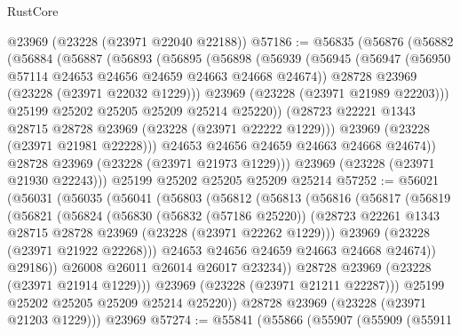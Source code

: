 \begin{lexlean}{RustCore}
\begin{coremodule}
    @23969
    (@23228 (@23971 @22040 @22188))
@57186 := @56835
    (@56876
      (@56882
        (@56884
          (@56887
            (@56893
              (@56895
                (@56898
                  (@56939
                    (@56945
                      (@56947 (@56950 @57114 @24653 @24656 @24659 @24663 @24668 @24674))
                      @28728
                      @23969
                      (@23228 (@23971 @22032 @1229)))
                    @23969
                    (@23228 (@23971 @21989 @22203)))
                  @25199
                  @25202
                  @25205
                  @25209
                  @25214
                  @25220))
              (@28723 @22221 @1343 @28715 @28728 @23969 (@23228 (@23971 @22222 @1229)))
              @23969
              (@23228 (@23971 @21981 @22228)))
            @24653
            @24656
            @24659
            @24663
            @24668
            @24674))
        @28728
        @23969
        (@23228 (@23971 @21973 @1229)))
      @23969
      (@23228 (@23971 @21930 @22243)))
    @25199
    @25202
    @25205
    @25209
    @25214
@57252 := @56021
    (@56031
      (@56035
        (@56041
          (@56803
            (@56812
              (@56813
                (@56816
                  (@56817
                    (@56819
                      (@56821
                        (@56824
                          (@56830
                            (@56832 (@57186 @25220))
                            (@28723
                              @22261
                              @1343
                              @28715
                              @28728
                              @23969
                              (@23228 (@23971 @22262 @1229)))
                            @23969
                            (@23228 (@23971 @21922 @22268)))
                          @24653
                          @24656
                          @24659
                          @24663
                          @24668
                          @24674))
                      @29186))
                  @26008
                  @26011
                  @26014
                  @26017
                  @23234))
              @28728
              @23969
              (@23228 (@23971 @21914 @1229)))
            @23969
            (@23228 (@23971 @21211 @22287)))
          @25199
          @25202
          @25205
          @25209
          @25214
          @25220))
      @28728
      @23969
      (@23228 (@23971 @21203 @1229)))
    @23969
@57274 := @55841
    (@55866
      (@55907
        (@55909
          (@55911

\end{coremodule}
\end{lexlean}
